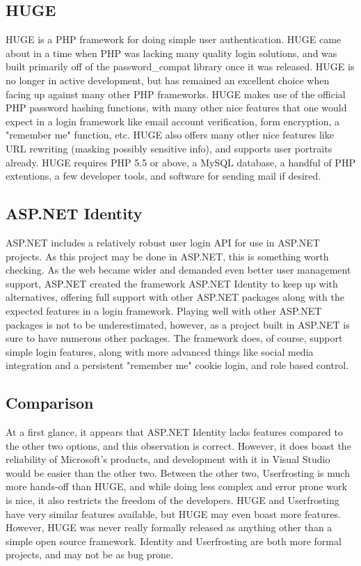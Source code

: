 \documentclass[onecolumn, draftclsnofoot,10pt, compsoc]{IEEEtran}
\begin{document}
\subsection{HUGE}
HUGE is a PHP framework for doing simple user authentication. HUGE came about in a time when PHP was lacking many quality login solutions, and was built
primarily off of the password_compat library once it was released. HUGE is no longer in active development, but has remained an excellent choice when facing 
up against many other PHP frameworks. HUGE makes use of the official PHP password hashing functions, with many other nice features that one would expect in a 
login framework like email account verification, form encryption, a "remember me" function, etc. HUGE also offers many other nice features like URL rewriting 
(masking possibly sensitive info), and supports user portraits already. HUGE requires PHP 5.5 or above, a MySQL database, a handful of PHP extentions, a few 
developer tools, and software for sending mail if desired.
\subsection{ASP.NET Identity}
ASP.NET includes a relatively robust user login API for use in ASP.NET projects. As this project may be done in ASP.NET, this is something worth checking. As the web
became wider and demanded even better user management support, ASP.NET created the framework ASP.NET Identity to keep up with alternatives, offering full support with
other ASP.NET packages along with the expected features in a login framework. Playing well with other ASP.NET packages is not to be underestimated, however, as a project 
built in ASP.NET is sure to have numerous other packages. The framework does, of course, support simple login features, along with more advanced things like social media 
integration and a persistent "remember me" cookie login, and role based control.
\subsection{Comparison}
At a first glance, it appears that ASP.NET Identity lacks features compared to the other two options, and this observation is correct. However, it does boast the reliability of
Microsoft's products, and development with it in Visual Studio would be easier than the other two. Between the other two, Userfrosting is much more hands-off than HUGE, and 
while doing less complex and error prone work is nice, it also restricts the freedom of the developers. HUGE and Userfrosting have very similar features available, but HUGE may 
even boast more features. However, HUGE was never really formally released as anything other than a simple open source framework. Identity and Userfrosting are both more formal 
projects, and may not be as bug prone.
\end{document}

